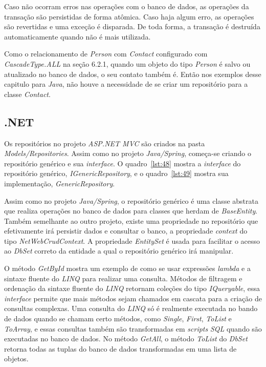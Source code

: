 \documentclass[a4paper,12pt]{article}
\newcommand{\est}[1] {
\textit{#1}}
\newcommand{\classe}[1] {
\textit{#1}}
\newcommand{\arquivo}[1] {
\textit{#1}}
\newcommand{\lang}[1] {
\textit{#1}}
\newcommand{\metodo}[1] {
\textit{#1}}
\newcommand{\sharpcode}[3] {
	
}
\begin{document}
Caso não ocorram erros nas operações com o banco de dados, as operações da transação são persistidas de forma atômica. Caso haja algum erro, as operações são revertidas e uma exceção é disparada. De toda forma, a transação é destruída automaticamente quando não é mais utilizada.

Como o relacionamento de \classe{Person} com \classe{Contact} configurado com \est{CascadeType.ALL} na seção 6.2.1, quando um objeto do tipo \classe{Person} é salvo ou atualizado no banco de dados, o seu contato também é. Então nos exemplos desse capitulo para \lang{Java}, não houve a necessidade de se criar um repositório para a classe \classe{Contact}.

\subsection{.NET}

Os repositórios no projeto \est{ASP.NET MVC} são criados na pasta \arquivo{Models/Repositories}. Assim como no projeto \est{Java/Spring}, começa-se criando o repositório genérico e sua \est{interface}. O quadro~\ref{lst:48} mostra a \est{interface} do repositório genérico, \classe{IGenericRepository}, e o quadro~\ref{lst:49} mostra sua implementação, \classe{GenericRepository}.

\sharpcode{code/48.txt}{\est{Interface} \classe{IGenericRepository}}{lst:48}

\sharpcode{code/49.txt}{Classe \classe{GenericRepository}}{lst:49}

Assim como no projeto \est{Java/Spring}, o repositório genérico é uma classe abstrata que realiza operações no banco de dados para classes que herdam de \classe{BaseEntity}. Também semelhante ao outro projeto, existe uma propriedade no repositório que efetivamente irá persistir dados e consultar o banco, a propriedade \est{context} do tipo \classe{NetWebCrudContext}. A propriedade \est{EntitySet} é usada para facilitar o acesso ao \classe{DbSet} correto da entidade a qual o repositório genérico irá manipular.

O método \metodo{GetById} mostra um exemplo de como se usar expressões \est{lambda} e a sintaxe fluente do \lang{LINQ} para realizar uma consulta. Métodos de filtragem e ordenação da sintaxe fluente do \lang{LINQ} retornam coleções do tipo \classe{IQueryable}, essa \est{interface} permite que mais métodos sejam chamados em cascata para a criação de consultas complexas. Uma consulta do \lang{LINQ} só é realmente executada no bando de dados quando se chamam certo métodos, como \metodo{Single}, \metodo{First}, \metodo{ToList} e \metodo{ToArray}, e essas consultas também são transformadas em \est{scripts} \lang{SQL} quando são executadas no banco de dados. No método \metodo{GetAll}, o método \metodo{ToList} do \classe{DbSet} retorna todas as tuplas do banco de dados transformadas em uma lista de objetos.
\end{document}
